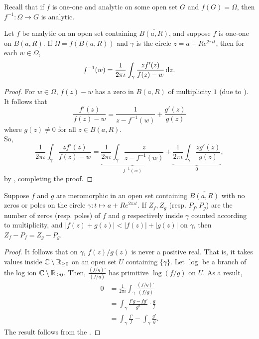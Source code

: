 	Recall that if $f$ is one-one and analytic on some open set $G$ and $f(G) = \Omega$, then $f^{-1} : \Omega \to G$ is analytic.


	\begin{prop}
		Let $f$ be analytic on an open set containing $\overline{B(a,R)}$, and suppose $f$ is one-one on $B(a,R)$. If $\Omega = f(B(a,R))$ and $\gamma$ is the circle $z = a+Re^{2\pi\iota t}$, then for each $w \in \Omega$,
		\[ f^{-1}(w) = \frac{1}{2\pi\iota} \int_{\gamma} \frac{zf'(z)}{f(z)-w} \dif z. \]
	\end{prop}
	\begin{proof}
		For $w \in \Omega$, $f(z) - w$ has a zero in $B(a,R)$ of multiplicity $1$ (due to ). It follows that
		\[ \frac{f'(z)}{f(z)-w} = \frac{1}{z-f^{-1}(w)} + \frac{g'(z)}{g(z)} \]
		where $g(z) \ne 0$ for all $z \in B(a,R)$.\\
		So,
		\[ \frac{1}{2\pi\iota} \int_{\gamma} \frac{zf'(z)}{f(z)-w} = \underbrace{\frac{1}{2\pi\iota}\int_{\gamma} \frac{z}{z-f^{-1}(w)}}_{f^{-1}(w)} + \underbrace{\frac{1}{2\pi\iota} \int_{\gamma} \frac{zg'(z)}{g(z)}}_{0}, \]
		by , completing the proof.
	\end{proof}


	\begin{ftheo}
		Suppose $f$ and $g$ are meromorphic in an open set containing $\overline{B(a,R)}$ with no zeros or poles on the circle $\gamma: t \mapsto a+Re^{2\pi\iota t}$. If $Z_f,Z_g$ (resp. $P_f,P_g$) are the number of zeros (resp. poles) of $f$ and $g$ respectively inside $\gamma$ counted according to multiplicity, and  $|f(z) + g(z)| < |f(z)| + |g(z)|$ on $\gamma$, then $Z_f - P_f = Z_g - P_g$.
	\end{ftheo}
	\begin{proof}
		It follows that on $\gamma$, $f(z)/g(z)$ is never a positive real. That is, it takes values inside $\mathbb{C} \setminus \mathbb{R}_{\ge 0}$ on an open set $U$ containing $\{\gamma\}$. Let $\log$ be a branch of the log ion $\mathbb{C} \setminus \mathbb{R}_{\ge 0}$. Then, $\frac{(f/g)'}{(f/g)}$ has primitive $\log(f/g)$ on $U$. As a result,
		\begin{align*}
			0 &= \frac{1}{2\pi\iota} \int_{\gamma} \frac{(f/g)'}{(f/g)} \\
				&= \int_{\gamma} \frac{f'g - fg'}{g^2} \cdot \frac{g}{f} \\
				&= \int_{\gamma} \frac{f'}{f} - \int_{\gamma} \frac{g'}{g}.
		\end{align*} 
		The result follows from the .
	\end{proof}